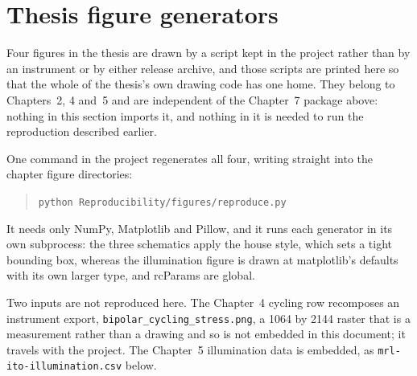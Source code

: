 \documentclass[a4paper,10pt]{article}
\begin{document}
\section{Thesis figure generators}
\label{sec:generators}
Four figures in the thesis are drawn by a script kept in the project rather than by an
instrument or by either release archive, and those scripts are printed here so that the whole
of the thesis's own drawing code has one home. They belong to Chapters~2, 4 and~5 and are
independent of the Chapter~7 package above: nothing in this section imports it, and nothing in
it is needed to run the reproduction described earlier.

One command in the project regenerates all four, writing straight into the chapter figure
directories:
\begin{quote}
\texttt{python Reproducibility/figures/reproduce.py}
\end{quote}
It needs only NumPy, Matplotlib and Pillow, and it runs each generator in its own subprocess:
the three schematics apply the house style, which sets a tight bounding box, whereas the
illumination figure is drawn at matplotlib's defaults with its own larger type, and rcParams
are global.

Two inputs are not reproduced here. The Chapter~4 cycling row recomposes an instrument
export, \texttt{bipolar\_cycling\_stress.png}, a 1064 by 2144 raster that is a
measurement rather than a drawing and so is not embedded in this document; it travels with the
project. The Chapter~5 illumination data is embedded, as \texttt{mrl-ito-illumination.csv} below.
\end{document}
